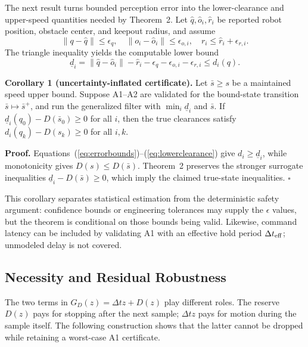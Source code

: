\documentclass[letterpaper]{article}
\begin{document}
The next result turns bounded perception error into the lower-clearance and
upper-speed quantities needed by Theorem~2.  Let $\hat q,\hat o_i,\hat r_i$
be reported robot position, obstacle center, and keepout radius, and assume
\begin{equation}
 \|q-\hat q\|\le\epsilon_q,\quad
 \|o_i-\hat o_i\|\le\epsilon_{o,i},\quad
 r_i\le\hat r_i+\epsilon_{r,i}.                         \label{eq:errorbounds}
\end{equation}
The triangle inequality yields the computable lower bound
\begin{equation}
 \underline d_i=
 \|\hat q-\hat o_i\|-\hat r_i
 -\epsilon_q-\epsilon_{o,i}-\epsilon_{r,i}
 \le d_i(q).                                             \label{eq:lowerclearance}
\end{equation}

\textbf{Corollary 1 (uncertainty-inflated certificate).}
Let $\bar s\ge s$ be a maintained speed upper bound.  Suppose A1--A2 are
validated for the bound-state transition $\bar s\mapsto\bar s^+$, and run the
generalized filter with $\min_i\underline d_i$ and $\bar s$.  If
$\underline d_i(q_0)-D(\bar s_0)\ge0$ for all $i$, then the true clearances
satisfy $d_i(q_k)-D(s_k)\ge0$ for all $i,k$.

\textbf{Proof.}
Equations~(\ref{eq:errorbounds})--(\ref{eq:lowerclearance}) give
$d_i\ge\underline d_i$, while monotonicity gives $D(s)\le D(\bar s)$.
Theorem~2 preserves the stronger surrogate inequalities
$\underline d_i-D(\bar s)\ge0$, which imply the claimed true-state
inequalities. $\square$

This corollary separates statistical estimation from the deterministic safety
argument: confidence bounds or engineering tolerances may supply the
$\epsilon$ values, but the theorem is conditional on those bounds being valid.
Likewise, command latency can be included by validating A1 with an effective
hold period $\Delta t_{\rm eff}$; unmodeled delay is not covered.

\subsection{Necessity and Residual Robustness}

The two terms in $G_D(z)=\Delta t z+D(z)$ play different roles.  The reserve
$D(z)$ pays for stopping after the next sample; $\Delta t z$ pays for motion
during the sample itself.  The following construction shows that the latter
cannot be dropped while retaining a worst-case A1 certificate.
\end{document}

